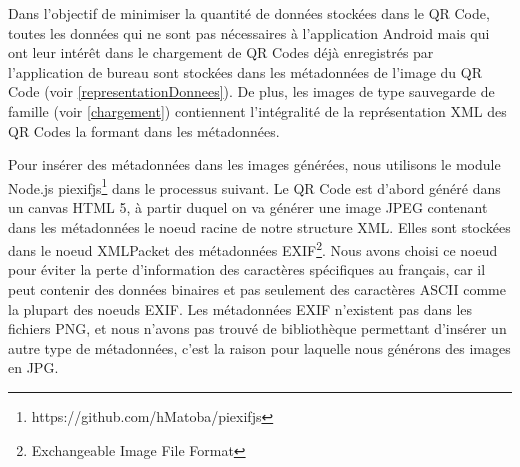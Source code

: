 \par
Dans l'objectif de minimiser la quantité de données stockées dans le QR Code, toutes les données qui ne sont pas nécessaires à l'application Android mais qui ont leur intérêt dans le chargement de QR Codes déjà enregistrés par l'application de bureau sont stockées dans les métadonnées de l'image du QR Code (voir \ref{representationDonnees}). De plus, les images de type sauvegarde de famille (voir \ref{chargement}) contiennent l'intégralité de la représentation XML des QR Codes la formant dans les métadonnées.\\
\par
Pour insérer des métadonnées dans les images générées, nous utilisons le module Node.js piexifjs\footnote{https://github.com/hMatoba/piexifjs} dans le processus suivant. Le QR Code est d'abord généré dans un canvas HTML 5, à partir duquel on va générer une image JPEG contenant dans les métadonnées le noeud racine de notre structure XML. Elles sont stockées dans le noeud XMLPacket des métadonnées EXIF\footnote{Exchangeable Image File Format}. Nous avons choisi ce noeud pour éviter la perte d'information des caractères spécifiques au français, car il peut contenir des données binaires et pas seulement des caractères ASCII comme la plupart des noeuds EXIF. Les métadonnées EXIF n'existent pas dans les fichiers PNG, et nous n'avons pas trouvé de bibliothèque permettant d'insérer un autre type de métadonnées, c'est la raison pour laquelle nous générons des images en JPG.